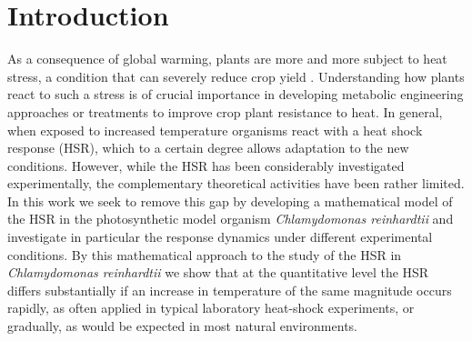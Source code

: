 \documentclass[oneside, 10pt, a4paper, twocolumn]{article}
\begin{document}
\section{Introduction}

As a consequence of global warming, plants are more and more subject to heat stress, a condition that can severely reduce crop yield \cite{Lobell2011,Deryng2014}.
Understanding how plants react to such a stress is of crucial importance in developing metabolic engineering approaches or treatments to improve crop plant resistance to heat. 
In general, when exposed to increased temperature organisms react
with a heat shock response (HSR), which to a certain degree allows adaptation to the new conditions. 
However, while the HSR has been %
considerably investigated experimentally, the complementary
theoretical activities %
have been rather limited. In this work we seek to remove this gap by
developing a mathematical model of the HSR in the photosynthetic model
organism \emph{Chlamydomonas reinhardtii} and investigate in
particular the response dynamics under different experimental
conditions. By this mathematical approach to the study of the HSR in
\emph{Chlamydomonas reinhardtii} we show that at the quantitative
level the HSR differs substantially if an increase in temperature of
the same magnitude occurs {rapidly, as often applied
  in typical laboratory heat-shock experiments, or gradually, as would be
  expected in most natural environments.}
\end{document}
